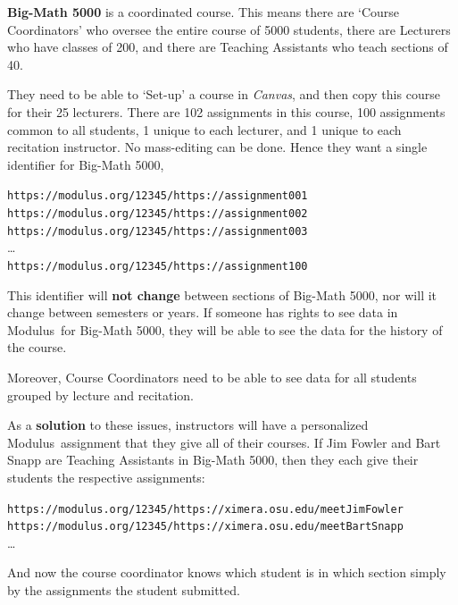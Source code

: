 \documentclass{techbrief}
\newcommand{\modulus}{\textsf{Modulus}}
\begin{document}
\begin{xframe}
    \textbf{Big-Math 5000} is a coordinated course. This means there are
    `Course Coordinators' who oversee the entire course of 5000 students,
    there are Lecturers who have classes of 200, and there are Teaching
    Assistants who teach sections of 40. 

    They need to be able to `Set-up' a course in \textsl{Canvas}, and then copy
    this course for their 25 lecturers. There are 102 assignments in this
    course, 100 assignments common to all students, 1 unique to each lecturer, and 1 unique to each recitation
    instructor. No mass-editing can be done. Hence they want a single identifier for
    Big-Math 5000,
    \begin{center}\scriptsize
        \texttt{https://modulus.org/12345/https://assignment001}\\
        \texttt{https://modulus.org/12345/https://assignment002}\\
        \texttt{https://modulus.org/12345/https://assignment003}\\
        \dots\\
        \texttt{https://modulus.org/12345/https://assignment100}\\
    \end{center}
    This identifier will \textbf{not change} between sections of Big-Math 5000,
    nor will it change between semesters or years. If someone has rights to see
    data in \modulus\ for Big-Math 5000, they will be able to see the data for
    the history of the course.

    Moreover, Course Coordinators need to be able to see data for all students
    grouped by lecture and recitation.

    As a \textbf{solution} to these issues, instructors will have a
    personalized
    \modulus\ assignment that they give all of their courses. If Jim Fowler and
    Bart Snapp are Teaching Assistants in Big-Math 5000, then they each give
    their
    students the respective assignments:
    \begin{center}\scriptsize

        \texttt{https://modulus.org/12345/https://ximera.osu.edu/meetJimFowler}\\

        \texttt{https://modulus.org/12345/https://ximera.osu.edu/meetBartSnapp}\\
        \dots
    \end{center}
    And now the course coordinator knows which student is in which section
    simply by the assignments the student submitted.
\end{xframe}
\end{document}
